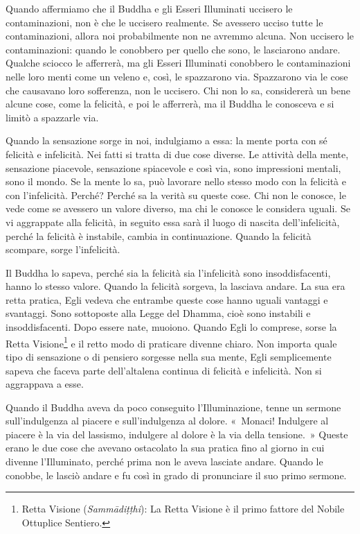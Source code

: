Quando affermiamo che il Buddha e gli Esseri Illuminati uccisero le
contaminazioni, non è che le uccisero realmente. Se avessero ucciso
tutte le contaminazioni, allora noi probabilmente non ne avremmo alcuna.
Non uccisero le contaminazioni: quando le conobbero per quello che sono,
le lasciarono andare. Qualche sciocco le afferrerà, ma gli Esseri
Illuminati conobbero le contaminazioni nelle loro menti come un veleno
e, così, le spazzarono via. Spazzarono via le cose che causavano loro
sofferenza, non le uccisero. Chi non lo sa, considererà un bene alcune
cose, come la felicità, e poi le afferrerà, ma il Buddha le conosceva e
si limitò a spazzarle via.

Quando la sensazione sorge in noi, indulgiamo a essa: la mente porta con
sé felicità e infelicità. Nei fatti si tratta di due cose diverse. Le
attività della mente, sensazione piacevole, sensazione spiacevole e così
via, sono impressioni mentali, sono il mondo. Se la mente lo sa, può
lavorare nello stesso modo con la felicità e con l'infelicità. Perché?
Perché sa la verità su queste cose. Chi non le conosce, le vede come se
avessero un valore diverso, ma chi le conosce le considera uguali. Se vi
aggrappate alla felicità, in seguito essa sarà il luogo di nascita
dell'infelicità, perché la felicità è instabile, cambia in
continuazione. Quando la felicità scompare, sorge l'infelicità.

Il Buddha lo sapeva, perché sia la felicità sia l'infelicità sono
insoddisfacenti, hanno lo stesso valore. Quando la felicità sorgeva, la
lasciava andare. La sua era retta pratica, Egli vedeva che entrambe
queste cose hanno uguali vantaggi e svantaggi. Sono sottoposte alla
Legge del Dhamma, cioè sono instabili e insoddisfacenti. Dopo essere
nate, muoiono. Quando Egli lo comprese, sorse la Retta Visione\footnote{Retta
  Visione (\emph{Sammādiṭṭhi}): La Retta Visione è il primo fattore del
  Nobile Ottuplice Sentiero.} e il retto modo di praticare divenne
chiaro. Non importa quale tipo di sensazione o di pensiero sorgesse
nella sua mente, Egli semplicemente sapeva che faceva parte
dell'altalena continua di felicità e infelicità. Non si aggrappava a
esse.

Quando il Buddha aveva da poco conseguito l'Illuminazione, tenne un
sermone sull'indulgenza al piacere e sull'indulgenza al dolore.
«~Monaci! Indulgere al piacere è la via del lassismo, indulgere al
dolore è la via della tensione.~» Queste erano le due cose che avevano
ostacolato la sua pratica fino al giorno in cui divenne l'Illuminato,
perché prima non le aveva lasciate andare. Quando le conobbe, le lasciò
andare e fu così in grado di pronunciare il suo primo sermone.

